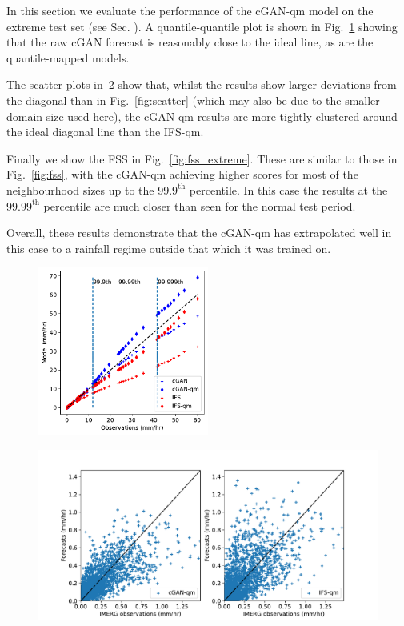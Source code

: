 \documentclass{article}
\begin{document}
In this section we evaluate the performance of the cGAN-qm model on the extreme test set (see Sec. ). A quantile-quantile plot is shown in Fig.~\ref{fig:quantiles_extreme} showing that the raw cGAN forecast is reasonably close to the ideal line, as are the quantile-mapped models. 

The scatter plots in~\ref{fig:scatter_extreme} show that, whilst the results show larger deviations from the diagonal than in Fig.~\ref{fig:scatter} (which may also be due to the smaller domain size used here), the cGAN-qm results are more tightly clustered around the ideal diagonal line than the IFS-qm. 

Finally we show the FSS in Fig.~\ref{fig:fss_extreme}. These are similar to those in Fig.~\ref{fig:fss}, with the cGAN-qm achieving higher scores for most of the neighbourhood sizes up to the $99.9^{\text{th}}$ percentile. In this case the results at the $99.99^{\text{th}}$ percentile are much closer than seen for the normal test period. 

Overall, these results demonstrate that the cGAN-qm has extrapolated well in this case to a rainfall regime outside that which it was trained on. 





\begin{figure}
     \centering
     \includegraphics[width=0.5\textwidth]{images/quantiles_total_final-nologs-mam2018_217600_kenya.pdf}
     
     \caption{
     }
     \label{fig:quantiles_extreme}
\end{figure}

\begin{figure}
     \centering
     \includegraphics[width=1.05\textwidth]{images/scatter_cl100-medium-nologs_217600_kenya.pdf}
     
     \caption{
     }
     \label{fig:scatter_extreme}
\end{figure}
\end{document}

